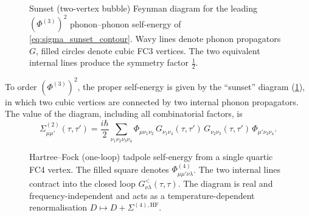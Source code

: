 \begin{figure}[ht]
\centering
{}
\caption{Sunset (two-vertex bubble) Feynman diagram for the leading
$(\Phi^{(3)})^2$ phonon--phonon self-energy of
\cref{eq:sigma_sunset_contour}. Wavy lines denote phonon propagators
$G$, filled circles denote cubic FC3 vertices. The two equivalent
internal lines produce the symmetry factor $\tfrac{1}{2}$.}
\label{fig:sunset_diagram}
\end{figure}


To order $(\Phi^{(3)})^2$, the proper self-energy is given by the
``sunset'' diagram (\cref{fig:sunset_diagram}), in which two cubic
vertices are connected by two internal phonon propagators. The
value of the diagram, including all combinatorial factors,
is~\cite{guo_quantum_2020,wang_nonequilibrium_2014}
\begin{equation}\label{eq:sigma_sunset_contour}
  \Sigma^{(2)}_{\mu\mu'}(\tau,\tau')
  = \frac{i\hbar}{2}\sum_{\nu_1\nu_2\nu_3\nu_4}
    \Phi_{\mu\nu_1\nu_2}\,
    G_{\nu_1\nu_4}(\tau,\tau')\,
    G_{\nu_2\nu_3}(\tau,\tau')\,
    \Phi_{\mu'\nu_3\nu_4}.
\end{equation}

\begin{figure}[ht]
\centering
{}
\caption{Hartree--Fock (one-loop) tadpole self-energy from a single
quartic FC4 vertex. The filled square denotes
$\Phi^{(4)}_{\mu\mu'\nu\lambda}$. The two internal lines contract into
the closed loop $G^{<}_{\nu\lambda}(\tau,\tau)$. The diagram is real
and frequency-independent and acts as a temperature-dependent
renormalisation $D\mapsto D + \Sigma^{(4),\mathrm{HF}}$.}
\label{fig:fc4_tadpole}
\end{figure}


